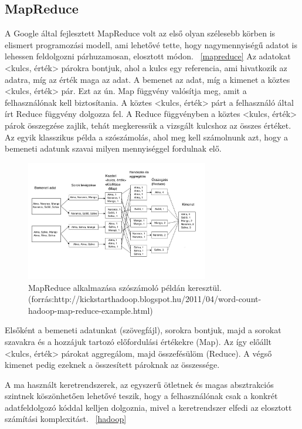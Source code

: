 \documentclass[a4paper,12pt]{article}
\begin{document}
\subsection{MapReduce}
A Google által fejlesztett MapReduce volt az első olyan szélesebb körben is elismert programozási modell, ami lehetővé tette, hogy nagymennyiségű adatot is lehessen feldolgozni párhuzamosan, elosztott módon. ~\ref{mapreduce} Az adatokat <kulcs, érték> párokra bontjuk, ahol a kulcs egy referencia, ami hivatkozik az adatra, míg az érték maga az adat. A bemenet az adat, míg a kimenet a köztes <kulcs, érték> pár. Ezt az ún. Map függvény valósítja meg, amit a felhasználónak kell biztosítania. A köztes <kulcs, érték> párt a felhasználó által írt Reduce függvény dolgozza fel. A Reduce függvényben a köztes <kulcs, érték> párok összegzése  zajlik, tehát megkeressük a vizsgált kulcshoz az összes értéket. \linebreak
Az egyik klasszikus példa a szószámolás, ahol meg kell számolnunk azt, hogy a bemeneti adatunk szavai milyen mennyiséggel fordulnak elő.

\begin{figure}[ht!]
\centering
\includegraphics[width=80mm]{img/wordcountflow.jpg}
\caption{MapReduce alkalmazása  szószámoló példán keresztül. (forrás:http://kickstarthadoop.blogspot.hu/2011/04/word-count-hadoop-map-reduce-example.html)
\label{wordcountflow}}
\end{figure}

Elsőként a bemeneti adatunkat (szövegfájl), sorokra bontjuk, majd a sorokat szavakra és a hozzájuk tartozó előfordulási értékekre (Map). Az így előállt <kulcs, érték> párokat aggregálom, majd összefésülöm (Reduce). A végső kimenet pedig ezeknek a összesített pároknak az összessége.

A ma használt keretrendszerek, az egyszerű ötletnek és magas absztrakciós szintnek köszönhetően lehetővé teszik, hogy a felhasználónak csak a konkrét adatfeldolgozó kóddal kelljen dolgoznia, mivel a keretrendszer elfedi az elosztott számítási komplexitást. ~\ref{hadoop}
\end{document}
